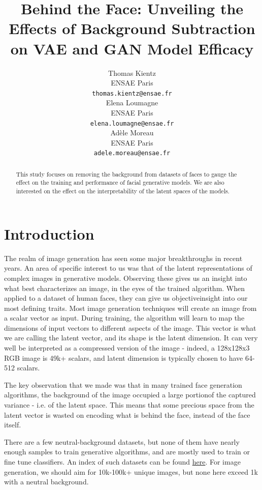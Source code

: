 \documentclass{article}
\title{Behind the Face: Unveiling the Effects of Background Subtraction on VAE and GAN Model Efficacy}
\author{%
  Thomas Kientz \\
  ENSAE Paris\\
  \texttt{thomas.kientz@ensae.fr} \\
  \And
  Elena Loumagne \\
  ENSAE Paris\\
  \texttt{elena.loumagne@ensae.fr} \\
  \AND
  Adèle Moreau \\
  ENSAE Paris\\
  \texttt{adele.moreau@ensae.fr} \\
}
\begin{document}
\maketitle

\begin{abstract}
  This study focuses on removing the background from datasets of faces to gauge the effect on the training and performance of facial generative models. We are also interested on the effect on the interpretability of the latent spaces of the models. 
\end{abstract}

\section{Introduction}

\quad The realm of image generation has seen some major breakthroughs in recent years. 
An area of specific interest to us was that of the latent representations of complex images in generative models. 
Observing these gives us an insight into what best characterizes an image, in the eyes of the trained algorithm. 
When applied to a dataset of human faces, they can give us objective\footnotemark insight into our most defining traits.
Most image generation techniques will create an image from a scalar vector as input. 
During training, the algorithm will learn to map the dimensions of input vectors to different aspects of the image. 
This vector is what we are calling the latent vector, and its shape is the latent dimension. 
It can very well be interpreted as a compressed version of the image - indeed, a 128x128x3 RGB image is 49k+ scalars, and latent dimension is typically chosen to have 64-512 scalars. 

The key observation that we made was that in many trained face generation algorithms, the background of the image occupied a large portion\footnotemark of the captured variance - i.e. of the latent space. 
This means that some precious space from the latent vector is wasted on encoding what is behind the face, instead of the face itself. 

There are a few neutral-background datasets, but none of them have nearly enough samples to train generative algorithms, and are mostly used to train or fine tune classifiers. 
An index of such datasets can be found \href{https://libguides.princeton.edu/facedatabases}{here}. 
For image generation, we should aim for 10k-100k+ unique images, but none here exceed 1k with a neutral background.
\end{document}
